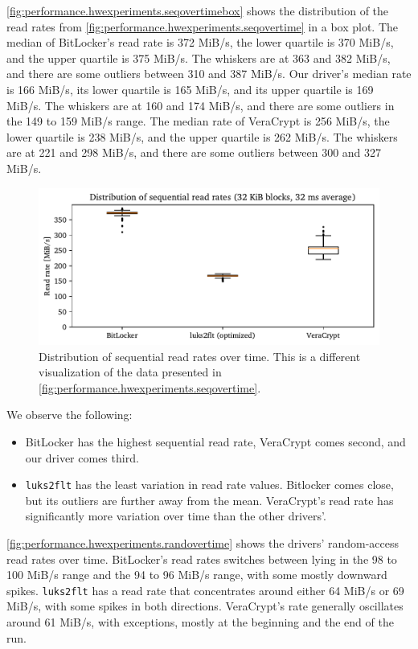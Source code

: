 \autoref{fig:performance.hwexperiments.seqovertimebox} shows the distribution of the read rates from \autoref{fig:performance.hwexperiments.seqovertime} in a box plot. The median of BitLocker's read rate is 372 MiB/s, the lower quartile is 370 MiB/s, and the upper quartile is 375 MiB/s. The whiskers are at 363 and 382 MiB/s, and there are some outliers between 310 and 387 MiB/s. Our driver's median rate is 166 MiB/s, its lower quartile is 165 MiB/s, and its upper quartile is 169 MiB/s. The whiskers are at 160 and 174 MiB/s, and there are some outliers in the 149 to 159 MiB/s range. The median rate of VeraCrypt is 256 MiB/s, the lower quartile is 238 MiB/s, and the upper quartile is 262 MiB/s. The whiskers are at 221 and 298 MiB/s, and there are some outliers between 300 and 327 MiB/s.

\begin{figure}[htb!]
	\center
	\includegraphics[scale=1]{../fig/performance.hwexperiments.seqovertimebox.pdf}
	\caption[
		Distribution of sequential read rates over time
	]{
		Distribution of sequential read rates over time. This is a different visualization of the data presented in \autoref{fig:performance.hwexperiments.seqovertime}.
	}
	\label{fig:performance.hwexperiments.seqovertimebox}
\end{figure}

We observe the following:
\begin{itemize}[beginpenalty=10000]
	\item BitLocker has the highest sequential read rate, VeraCrypt comes second, and our driver comes third.
	\item \texttt{luks2flt} has the least variation in read rate values. Bitlocker comes close, but its outliers are further away from the mean. VeraCrypt's read rate has significantly more variation over time than the other drivers'.
\end{itemize}

\autoref{fig:performance.hwexperiments.randovertime} shows the drivers' random-access read rates over time. BitLocker's read rates switches between lying in the 98 to 100 MiB/s range and the 94 to 96 MiB/s range, with some mostly downward spikes. \texttt{luks2flt} has a read rate that concentrates around either 64 MiB/s or 69 MiB/s, with some spikes in both directions. VeraCrypt's rate generally oscillates around 61 MiB/s, with exceptions, mostly at the beginning and the end of the run.

